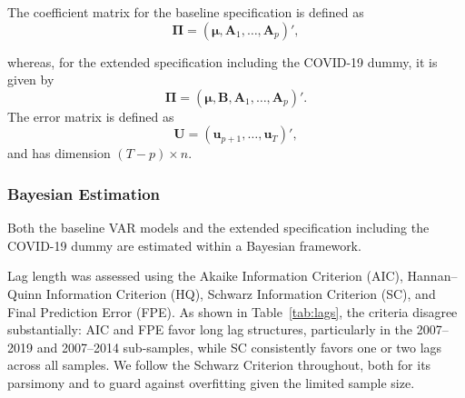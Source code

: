 \documentclass[12pt]{scrartcl}
\numberwithin{equation}{section}				%
\begin{document}
     The coefficient matrix for the baseline specification is defined as
     \begin{equation}
     	\mathbf{\Pi} = \left( \boldsymbol{\mu}, \mathbf{A}_1,\ldots,\mathbf{A}_p
     	\right)',\end{equation}
     
     whereas, for the extended specification including the COVID-19 dummy, it is
     given by
     \begin{equation}
     	\mathbf{\Pi} = \left(\boldsymbol{\mu},\mathbf{B},\mathbf{A}_1,\ldots,
     	\mathbf{A}_p \right)'.\end{equation}
     The error matrix is defined as
     \begin{equation}
     	\mathbf{U} = \left(\mathbf{u}_{p+1},\ldots,\mathbf{u}_{T}\right)',
     \end{equation}
     and has dimension $(T-p) \times n$.
     
     \subsubsection{Bayesian Estimation}
     
     Both the baseline VAR models and the extended specification including the
     COVID-19 dummy are estimated within a Bayesian framework. 
     
     Lag length was assessed using the Akaike Information Criterion (AIC),
     Hannan--Quinn Information Criterion (HQ), Schwarz Information Criterion
     (SC), and Final Prediction Error (FPE). As shown in
     Table~\ref{tab:lags}, the criteria disagree substantially: AIC
     and FPE favor long lag structures, particularly in the 2007--2019 and
     2007--2014 sub-samples, while SC consistently favors one or two lags
     across all samples. We follow the Schwarz Criterion throughout, both
     for its parsimony and to guard against overfitting given the limited
     sample size. 
     
\end{document}
